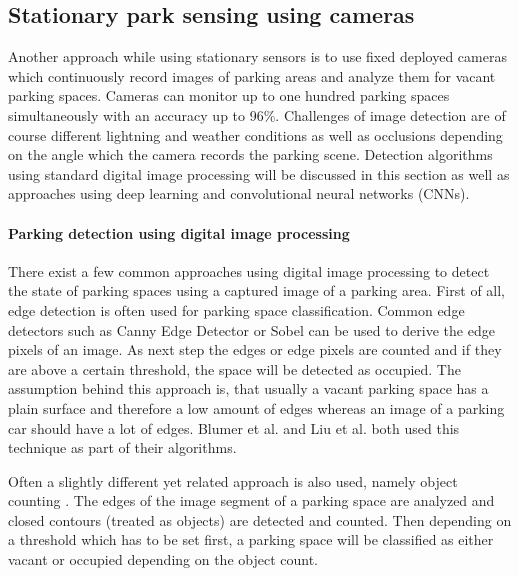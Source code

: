 




\subsection{Stationary park sensing using cameras}
\label{sec:stationary_park_sensing_cameras}

Another approach while using stationary sensors is to use fixed deployed cameras which continuously record images of parking areas and analyze them for vacant parking spaces. Cameras can monitor up to one hundred parking spaces simultaneously with an accuracy
up to 96\%. Challenges of image detection are of course different lightning and weather conditions as well as occlusions depending on the angle which the camera records the parking scene. Detection algorithms using standard digital image processing will be discussed in this section as well as approaches using deep learning and convolutional neural networks (CNNs).


\paragraph{Parking detection using digital image processing}

There exist a few common approaches using digital image processing to detect the state of parking spaces using a captured image of a parking area. First of all, edge detection is often used for parking space classification. Common edge detectors such as Canny
Edge Detector or Sobel can be used to derive the edge pixels of an image. As next step the edges or edge pixels are counted and if they are above a certain threshold, the space will be detected as occupied. The assumption behind this approach is, that usually a vacant parking space has a plain surface and therefore a low amount of edges whereas an image of a parking car should have a lot of edges. Blumer et al. \cite{Blumer2012} and Liu et al.
\cite{stationary_camera_sensing} both used this technique as part of their algorithms.

Often a slightly different yet related approach is also used, namely object counting \cite{stationary_camera_sensing}. The edges of the image segment of a parking space are analyzed and closed contours (treated as objects) are detected and counted. Then depending on a threshold which has to be set first, a parking space will be classified as either vacant or occupied depending on the object count.

